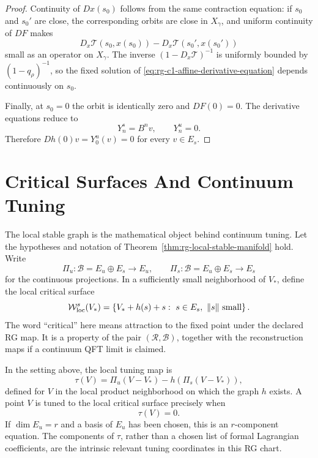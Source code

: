 \begin{proof}
Continuity of \(Dx(s_0)\) follows from the same contraction equation:
if \(s_0\) and \(s_0'\) are close, the corresponding orbits are close in
\(X_\gamma\), and uniform continuity of \(DF\) makes
\[
  D_x\mathcal T(s_0,x(s_0))
  -
  D_x\mathcal T(s_0',x(s_0'))
\]
small as an operator on \(X_\gamma\).  The inverse
\((1-D_x\mathcal T)^{-1}\) is uniformly bounded by
\((1-q_\rho)^{-1}\), so the fixed solution of
\eqref{eq:rg-c1-affine-derivative-equation} depends continuously on
\(s_0\).

Finally, at \(s_0=0\) the orbit is identically zero and \(DF(0)=0\).  The
derivative equations reduce to
\[
  Y^s_n=B^n v,\qquad Y^u_n=0 .
\]
Therefore \(Dh(0)v=Y^u_0(v)=0\) for every \(v\in E_s\).
\end{proof}

\section{Critical Surfaces And Continuum Tuning}

The local stable graph is the mathematical object behind continuum tuning.
Let the hypotheses and notation of
Theorem~\ref{thm:rg-local-stable-manifold} hold.  Write
\[
  \Pi_u:\mathcal B=E_u\oplus E_s\longrightarrow E_u,
  \qquad
  \Pi_s:\mathcal B=E_u\oplus E_s\longrightarrow E_s
\]
for the continuous projections.  In a sufficiently small neighborhood of
\(V_\ast\), define the local critical surface
\begin{equation}
  \mathcal W^s_{\rm loc}(V_\ast)
  =
  \left\{
    V_\ast+h(s)+s:\ s\in E_s,\ \|s\|\ {\rm small}
  \right\}.
  \label{eq:local-critical-surface-rg}
\end{equation}
The word ``critical'' here means attraction to the fixed point under the
declared RG map.  It is a property of the pair
\((\mathcal R,\mathcal B)\), together with the reconstruction maps if a
continuum QFT limit is claimed.

\begin{definition}
\label{def:rg-tuning-map}
In the setting above, the local tuning map is
\begin{equation}
  \tau(V)
  =
  \Pi_u(V-V_\ast)-h\!\left(\Pi_s(V-V_\ast)\right),
  \label{eq:rg-tuning-map}
\end{equation}
defined for \(V\) in the local product neighborhood on which the graph
\(h\) exists.  A point \(V\) is tuned to the local critical surface precisely
when
\begin{equation}
  \tau(V)=0 .
  \label{eq:rg-tuning-equation}
\end{equation}
If \(\dim E_u=r\) and a basis of \(E_u\) has been chosen, this is an
\(r\)-component equation.  The components of \(\tau\), rather than a chosen
list of formal Lagrangian coefficients, are the intrinsic relevant tuning
coordinates in this RG chart.
\end{definition}

